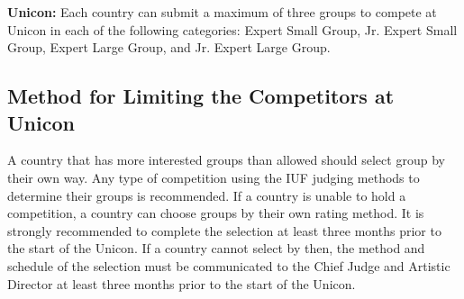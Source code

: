 \textbf{Unicon:} Each country can submit a maximum of three groups to compete at Unicon in each of the following categories: Expert Small Group, Jr. Expert Small Group, Expert Large Group, and Jr. Expert Large Group.

\subsection{Method for Limiting the Competitors at Unicon}
A country that has more interested groups than allowed should select group by their own way.
Any type of competition using the IUF judging methods to determine their groups is recommended.
If a country is unable to hold a competition, a country can choose groups by their own rating method.
It is strongly recommended to complete the selection at least three months prior to the start of the Unicon.
If a country cannot select by then, the method and schedule of the selection must be communicated to the Chief Judge and Artistic Director at least three months prior to the start of the Unicon.
